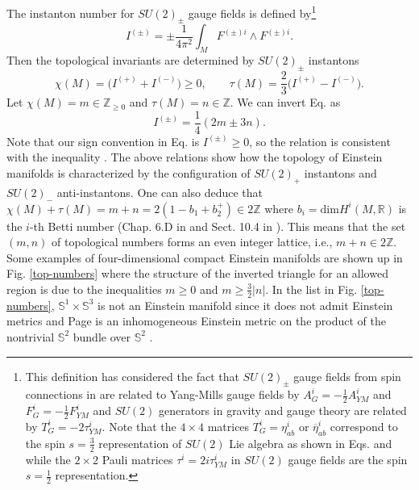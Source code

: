 \documentclass[12pt,epsf]{article}
\begin{document}
The instanton number for $SU(2)_\pm$ gauge fields is defined by\footnote{This definition has considered
the fact \cite{opy-jhep} that $SU(2)_\pm$ gauge fields from spin connections in 
are related to Yang-Mills gauge fields by $A^i_G = - \frac{1}{2} A^i_{YM}$
and $F^i_G = - \frac{1}{2} F^i_{YM}$ and $SU(2)$ generators in gravity and gauge theory are related by $T^i_G = - 2 \tau^i_{YM}$.
Note that the $4 \times 4$ matrices $T^i_G = \eta^i_{ab}$ or $\overline{\eta}^i_{ab}$
correspond to the spin $s=\frac{3}{2}$ representation of $SU(2)$ Lie algebra as shown in Eqs.  and 
while the $2 \times 2$ Pauli matrices $\tau^i = 2i \tau^i_{YM}$ in $SU(2)$ gauge fields are the spin $s=\frac{1}{2}$ representation.}
\begin{equation}\label{inst-number}
  I^{(\pm)} = \pm \frac{1}{4 \pi^2}\int_M F^{(\pm)i} \wedge F^{(\pm)i}.
\end{equation}
Then the topological invariants are determined by $SU(2)_\pm$ instantons
\begin{equation} \label{top-inst}
\chi(M) = \big( I^{(+)} + I^{(-)} \big) \geq 0, \qquad
\tau (M) = \frac{2}{3}  \big( I^{(+)} - I^{(-)} \big).
\end{equation}
Let $\chi(M) = m \in \mathbb{Z}_{\geq 0}$ and $\tau(M) = n \in \mathbb{Z}$.
We can invert Eq.  as
\begin{equation}\label{inst-mn}
 I^{(\pm)} = \frac{1}{4} \left( 2 m \pm 3 n \right).
\end{equation}
Note that our sign convention in Eq.  is $I^{(\pm)} \geq 0$, so the relation 
is consistent with the inequality .
The above relations show how the topology of Einstein manifolds is characterized by the configuration
of $SU(2)_+$ instantons and $SU(2)_-$ anti-instantons. One can also deduce that $\chi(M) + \tau (M)
= m + n = 2(1- b_1 + b_2^+) \in 2 \mathbb{Z}$ where $b_i = \mathrm{dim} H^i (M, \mathbb{R})$
is the $i$-th Betti number (Chap. 6.D in \cite{book-besse} and Sect. 10.4 in \cite{egh-report}).
This means that the set $(m,n)$ of topological numbers forms an even integer lattice, i.e.,
$m + n \in 2 \mathbb{Z}$. Some examples of four-dimensional compact Einstein manifolds
are shown up in Fig. \ref{top-numbers} where the structure of the inverted triangle for an allowed region is due to the inequalities
$m \geq 0$ and $m \geq  \frac{3}{2} |n|$. In the list in Fig. \ref{top-numbers},
$\mathbb{S}^1 \times \mathbb{S}^3$ is not an Einstein manifold
since it does not admit Einstein metrics \cite{hitchin1974}
and Page is an inhomogeneous Einstein metric on the product of the nontrivial $\mathbb{S}^2$ bundle
over $\mathbb{S}^2$ \cite{page-metric}.
\end{document}
